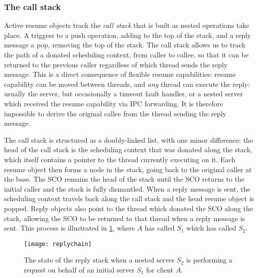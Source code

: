 \subsubsection{The call stack}

Active resume objects track the \emph{call stack} that is built as nested \call operations take
place. A \call triggers to a push operation, adding to the top of the stack, and a reply message a
pop, removing the top of the stack.  The call stack allows us to track the path of a donated
scheduling context, from caller to callee, so that it can be returned to the previous caller
regardless of which thread sends the reply message. This is a direct consequence of flexible resume
capabilities: resume capability can be moved between threads, and \emph{any} thread can execute the
reply: usually the server, but occasionally a timeout fault handler, or a nested server which
received the resume capability via \gls{IPC} forwarding. It is therefore impossible to derive the
original callee from the thread sending the reply message.

The call stack is structured as a doubly-linked list, with one minor difference: the head of the
call stack is the scheduling context that was donated along the stack, which itself contains a
pointer to the thread currently executing on it. Each resume object then forms a node in the
stack, going back to the original caller at the base. The \gls{SCO} remains the head of the stack
until the \gls{SCO} returns to the initial caller and the stack is fully dismantled.  When a reply
message is sent, the scheduling context travels back along the call stack and the head resume object
is popped.  Reply objects also point to the thread which donated the \gls{SCO} along the stack,
allowing the SCO to be returned to that thread when a reply message is sent.  This process is
illustrated in \cref{f:reply-stack}, where $A$ has called $S_{1}$ which has called  $S_{2}$.

\begin{figure}[t]
    \centering
    \texttt{[image: replychain]}
    \caption{The state of the reply stack when a nested server $S_{2}$ is
performing a request on behalf of an initial server $S_{1}$ for client $A$.}
    \label{f:reply-stack}
\end{figure}

